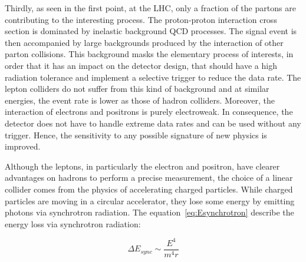     Thirdly, as seen in the first point, at the \gls{LHC}, only a fraction of the partons are contributing to the interesting process. 
    The proton-proton interaction cross section is dominated by inelastic background QCD processes.
    The signal event is then accompanied by large backgrounds produced by the interaction of other parton collisions.
    This background masks the elementary process of interests, in order that it has an impact on the detector design, that should have a high radiation tolerance and implement a selective trigger to reduce the data rate.
    The lepton colliders do not suffer from this kind of background and at similar energies, the event rate is lower as those of hadron colliders.
    Moreover, the interaction of electrons and positrons is purely electroweak.
    In consequence, the detector does not have to handle extreme data rates and can be used without any trigger.
    Hence, the sensitivity to any possible signature of new physics is improved.

    Although the leptons, in particularly the electron and positron, have clearer advantages on hadrons to perform a precise measurement, the choice of a linear collider comes from the physics of accelerating charged particles.
    While charged particles are moving in a circular accelerator, they lose some energy by emitting photons via synchrotron radiation.
    The equation~\ref{eq:Esynchrotron} describe the energy loss via synchrotron radiation:
    
    
    \begin{equation}
     \Delta E_{sync} \sim \frac{E^4}{m^4r}
       \label{eq:Esynchrotron}
    \end{equation} 

